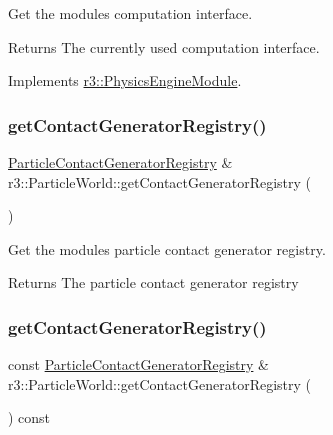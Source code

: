 Get the module\textquotesingle{}s computation interface. 

\begin{DoxyReturn}{Returns}
The currently used computation interface. 
\end{DoxyReturn}


Implements \mbox{\hyperlink{classr3_1_1_physics_engine_module_a3b1d0d9bea0a82534f367f6d728312d3}{r3\+::\+Physics\+Engine\+Module}}.

\mbox{\label{classr3_1_1_particle_world_a85fc9fcf5c51a5bbce206a35a82f8ccf}} 
\subsubsection{\texorpdfstring{get\+Contact\+Generator\+Registry()}{getContactGeneratorRegistry()}\hspace{0.1cm}{\footnotesize\ttfamily [1/2]}}
{\footnotesize\ttfamily \mbox{\hyperlink{classr3_1_1_particle_contact_generator_registry}{Particle\+Contact\+Generator\+Registry}} \& r3\+::\+Particle\+World\+::get\+Contact\+Generator\+Registry (\begin{DoxyParamCaption}{ }\end{DoxyParamCaption})}



Get the module\textquotesingle{}s particle contact generator registry. 

\begin{DoxyReturn}{Returns}
The particle contact generator registry 
\end{DoxyReturn}
\mbox{\label{classr3_1_1_particle_world_ab5cd3adaed73294927de72f3293b0709}} 
\subsubsection{\texorpdfstring{get\+Contact\+Generator\+Registry()}{getContactGeneratorRegistry()}\hspace{0.1cm}{\footnotesize\ttfamily [2/2]}}
{\footnotesize\ttfamily const \mbox{\hyperlink{classr3_1_1_particle_contact_generator_registry}{Particle\+Contact\+Generator\+Registry}} \& r3\+::\+Particle\+World\+::get\+Contact\+Generator\+Registry (\begin{DoxyParamCaption}{ }\end{DoxyParamCaption}) const}



